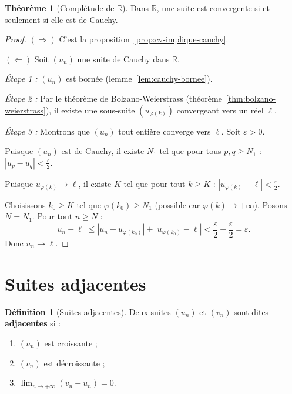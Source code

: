 \documentclass[12pt,a4paper,openany]{book}
\theoremstyle{definition}
\newtheorem{definition}{Définition}[chapter]
\newtheorem{theoreme}{Théorème}[chapter]
\newcommand{\R}{\mathbb{R}}
\newcommand{\eps}{\varepsilon}
\newcommand{\abs}[1]{\left\lvert #1 \right\rvert}
\begin{document}
\begin{theoreme}[Complétude de $\R$]\label{thm:cauchy-R}
  \index{complétude de $\R$}
  Dans $\R$, une suite est convergente si et seulement si elle est de Cauchy.
\end{theoreme}

\begin{proof}
  $(\Rightarrow)$ C'est la proposition~\ref{prop:cv-implique-cauchy}.

  $(\Leftarrow)$ Soit $(u_n)$ une suite de Cauchy dans $\R$.

  \textit{Étape 1 :} $(u_n)$ est bornée (lemme~\ref{lem:cauchy-bornee}).

  \textit{Étape 2 :} Par le théorème de Bolzano-Weierstrass (théorème~\ref{thm:bolzano-weierstrass}),
  il existe une sous-suite $(u_{\varphi(k)})$ convergeant vers un réel $\ell$.

  \textit{Étape 3 :} Montrons que $(u_n)$ tout entière converge vers $\ell$.
  Soit $\eps > 0$.

  Puisque $(u_n)$ est de Cauchy, il existe $N_1$ tel que pour tous $p, q \geq N_1$ :
  $\abs{u_p - u_q} < \frac{\eps}{2}$.

  Puisque $u_{\varphi(k)} \to \ell$, il existe $K$ tel que pour tout $k \geq K$ :
  $\abs{u_{\varphi(k)} - \ell} < \frac{\eps}{2}$.

  Choisissons $k_0 \geq K$ tel que $\varphi(k_0) \geq N_1$ (possible car $\varphi(k) \to +\infty$).
  Posons $N = N_1$. Pour tout $n \geq N$ :
  \[
    \abs{u_n - \ell} \leq \abs{u_n - u_{\varphi(k_0)}} + \abs{u_{\varphi(k_0)} - \ell}
      < \frac{\eps}{2} + \frac{\eps}{2} = \eps.
  \]
  Donc $u_n \to \ell$.
\end{proof}

\section{Suites adjacentes}\label{sec:suites:adjacentes}

\begin{definition}[Suites adjacentes]\label{def:suites-adjacentes}
  Deux suites $(u_n)$ et $(v_n)$ sont dites \textbf{adjacentes} si :
  \begin{enumerate}[label=(\roman*)]
    \item $(u_n)$ est croissante ;
    \item $(v_n)$ est décroissante ;
    \item $\lim_{n \to +\infty} (v_n - u_n) = 0$.
  \end{enumerate}
\end{definition}
\end{document}
